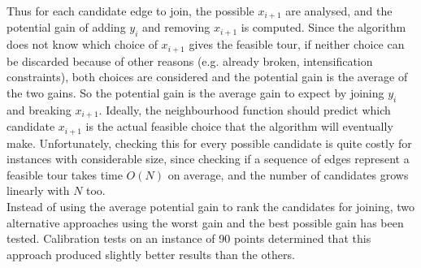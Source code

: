 Thus for each candidate edge to join, the possible $x_{i+1}$ are analysed, and the potential gain of adding $y_i$ and removing $x_{i+1}$ is computed. Since the algorithm does not know which choice of $x_{i+1}$ gives the feasible tour, if neither choice can be discarded because of other reasons (e.g. already broken, intensification constraints), both choices are considered and the potential gain is the average of the two gains. So the potential gain is the average gain to expect by joining $y_i$ and breaking $x_{i+1}$. Ideally, the neighbourhood function should predict which candidate $x_{i+1}$ is the actual feasible choice that the algorithm will eventually make. Unfortunately, checking this for every possible candidate is quite costly for instances with considerable size, since checking if a sequence of edges represent a feasible tour takes time $O(N)$ on average, and the number of candidates grows linearly with $N$ too.\\
Instead of using the average potential gain to rank the candidates for joining, two alternative approaches using the worst gain and the best possible gain has been tested. Calibration tests on an instance of 90 points determined that this approach produced slightly better results than the others.


